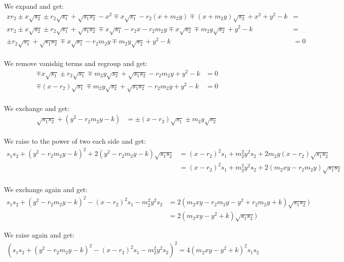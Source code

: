 \noindent
We expand and get:
\begin{align*}
  x r_2 \pm x \sqrt{s_2} \pm r_2 \sqrt{s_1} + \sqrt{s_1 s_2} - x^2 \mp x\sqrt{s_1} - r_2 (x + m_2 y) \mp (x + m_2 y)\sqrt{s_2} + x^2 + y^2 - k &= \\
  x r_2 \pm x \sqrt{s_2} \pm r_2 \sqrt{s_1} + \sqrt{s_1 s_2} \mp x\sqrt{s_1} - r_2 x - r_2 m_2 y \mp x \sqrt{s_2} \mp m_2 y\sqrt{s_2}  + y^2 - k &= \\
  \pm r_2 \sqrt{s_1} + \sqrt{s_1 s_2} \mp x\sqrt{s_1} - r_2 m_2 y \mp m_2 y\sqrt{s_2}  + y^2 - k &= 0\\
\end{align*}

\noindent
We remove vanishig terms and regroup and get:
\begin{align*}
  \mp x\sqrt{s_1} \pm r_2 \sqrt{s_1} \mp m_2 y \sqrt{s_2} + \sqrt{s_1 s_2} - r_2 m_2 y + y^2 - k &= 0\\
  \mp (x - r_2) \sqrt{s_1} \mp m_2 y \sqrt{s_2} + \sqrt{s_1 s_2} - r_2 m_2 y + y^2 - k &= 0\\
\end{align*}

\noindent
We exchange and get:
\begin{align*}
  \sqrt{s_1 s_2} + (y^2 - r_2 m_2 y - k) &= \pm (x - r_2) \sqrt{s_1} \pm m_2 y \sqrt{s_2}\\
\end{align*}

\noindent
We raise to the power of two each side and get:
\begin{align*}
  s_1 s_2 + (y^2 - r_2 m_2 y - k)^2 + 2 (y^2 - r_2 m_2 y - k) \sqrt{s_1 s_2}
  &= (x - r_2)^2 s_1 + m_2^2 y^2 s_2 + 2 m_2 y (x - r_2) \sqrt{s_1 s_2}\\
  &= (x - r_2)^2 s_1 + m_2^2 y^2 s_2 + 2 (m_2 x y - r_2 m_2 y) \sqrt{s_1 s_2}\\
\end{align*}

\noindent
We exchange again and get:
\begin{align*}
  s_1 s_2 + (y^2 - r_2 m_2 y - k)^2 - (x - r_2)^2 s_1 - m_2^2 y^2 s_2
  &= 2 (m_2 x y - r_2 m_2 y - y^2 + r_2 m_2 y + k) \sqrt{s_1 s_2})\\
  &= 2 (m_2 x y - y^2 + k) \sqrt{s_1 s_2})
\end{align*}

\noindent
We raise again and get:
\begin{align*}
  (s_1 s_2 + (y^2 - r_2 m_2 y - k)^2 - (x - r_2)^2 s_1 - m_2^2 y^2 s_2)^2 = 4 (m_2 x y - y^2 + k)^2 s_1 s_2
\end{align*}

